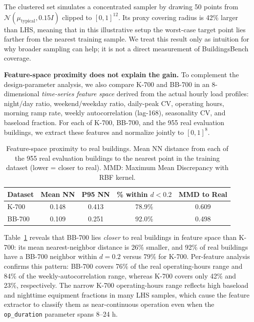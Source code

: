 \documentclass[preprint,12pt,authoryear]{elsarticle}
\begin{document}
The clustered set simulates a concentrated sampler by drawing 50 points from $\mathcal{N}(\mu_{\text{typical}}, 0.15I)$ clipped to $[0,1]^{12}$. Its proxy covering radius is 42\% larger than LHS, meaning that in this illustrative setup the worst-case target point lies farther from the nearest training sample. We treat this result only as intuition for why broader sampling can help; it is not a direct measurement of BuildingsBench coverage.

\textbf{Feature-space proximity does not explain the gain.} To complement the design-parameter analysis, we also compare K-700 and BB-700 in an 8-dimensional \emph{time-series feature space} derived from the actual hourly load profiles: night/day ratio, weekend/weekday ratio, daily-peak CV, operating hours, morning ramp rate, weekly autocorrelation (lag-168), seasonality CV, and baseload fraction. For each of K-700, BB-700, and the 955 real evaluation buildings, we extract these features and normalize jointly to $[0,1]^8$.

\begin{table}[htbp]
\caption{Feature-space proximity to real buildings. Mean NN distance from each of the 955 real evaluation buildings to the nearest point in the training dataset (lower = closer to real). MMD: Maximum Mean Discrepancy with RBF kernel.}
\label{tab:feature_coverage}
\centering
\begin{tabular}{lcccc}
\toprule
Dataset & Mean NN & P95 NN & \% within $d < 0.2$ & MMD to Real \\
\midrule
K-700 & 0.148 & 0.413 & 78.9\% & 0.609 \\
BB-700 & 0.109 & 0.251 & 92.0\% & 0.498 \\
\bottomrule
\end{tabular}
\end{table}

Table~\ref{tab:feature_coverage} reveals that BB-700 lies \emph{closer} to real buildings in feature space than K-700: its mean nearest-neighbor distance is 26\% smaller, and 92\% of real buildings have a BB-700 neighbor within $d = 0.2$ versus 79\% for K-700. Per-feature analysis confirms this pattern: BB-700 covers 76\% of the real operating-hours range and 84\% of the weekly-autocorrelation range, whereas K-700 covers only 42\% and 23\%, respectively. The narrow K-700 operating-hours range reflects high baseload and nighttime equipment fractions in many LHS samples, which cause the feature extractor to classify them as near-continuous operation even when the \texttt{op\_duration} parameter spans 8--24 h.
\end{document}

